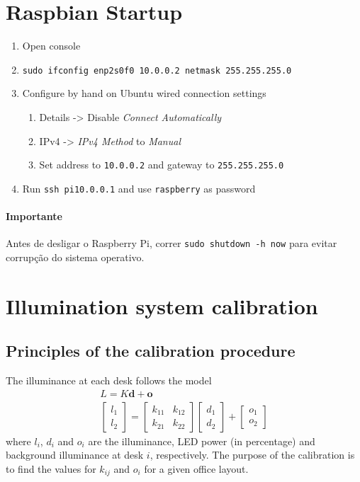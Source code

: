\documentclass[english,palatino]{ist-report}
\begin{document}
\section{Raspbian Startup}
\begin{enumerate}
	\item Open console
	\item \texttt{sudo ifconfig enp2s0f0 10.0.0.2 netmask 255.255.255.0}
	\item Configure by hand on Ubuntu wired connection settings
	\begin{enumerate}
		\item Details -> Disable \textit{Connect Automatically}
		\item IPv4 -> \textit{IPv4 Method} to \textit{Manual}
		\item Set address to \texttt{10.0.0.2} and gateway to \texttt{255.255.255.0}
	\end{enumerate}
	\item Run \texttt{ssh pi\@10.0.0.1} and use \texttt{raspberry} as password
\end{enumerate}

\paragraph{Importante} Antes de desligar o Raspberry Pi, correr \texttt{sudo shutdown -h now} para evitar corrupção do sistema operativo.


\section{Illumination system calibration}

\subsection{Principles of the calibration procedure}

The illuminance at each desk follows the model
\begin{gather}
  L = K \mathbf{d} + \mathbf{o} \nonumber \\ 
  \left[\begin{array}{c} l_{1}\\ l_{2} \end{array}\right] =
  \left[\begin{array}{cc}
	k_{11} & k_{12}\\
	k_{21} & k_{22}
  \end{array}\right]
  \left[\begin{array}{c} d_{1}\\ d_{2}\end{array}\right]+
  \left[\begin{array}{c} o_{1}\\ o_{2} \end{array}\right]
  \label{eq:model}
\end{gather}
where $l_i$, $d_i$ and $o_i$ are the illuminance, LED power (in percentage) and background illuminance at desk $i$, respectively. The purpose of the calibration is to find the values for $k_{ij}$ and $o_i$ for a given office layout.
\end{document}
